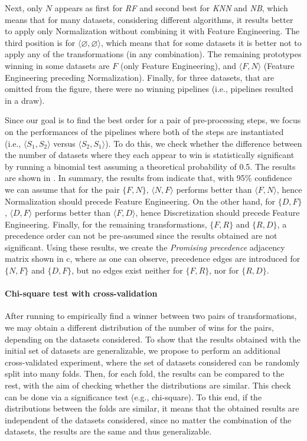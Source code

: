 \begin{example}
Next, only $N$ appears as first for \textit{RF} and second best for \textit{KNN} and \textit{NB}, which means that for many datasets, considering different algorithms, it results better to apply only Normalization without combining it with Feature Engineering.
The third position is for $\langle \varnothing,  \varnothing \rangle$, which means that for some datasets it is better not to apply any of the transformations (in any combination).
The remaining prototypes winning in some datasets are $F$ (only Feature Engineering), and $\langle F, N \rangle$ (Feature Engineering preceding Normalization).
Finally, for three datasets, that are omitted from the figure, there were no winning pipelines (i.e., pipelines resulted in a draw).

Since our goal is to find the best order for a pair of pre-processing steps, we focus on the performances of the pipelines where both of the steps are instantiated (i.e., $\langle S_1, S_2 \rangle$ versus $\langle S_2, S_1 \rangle$).
To do this, we check whether the difference between the number of datasets where they each appear to win is statistically significant by running a binomial test assuming a theoretical probability of 0.5.
The results are shown in .
In summary, the results from  indicate that, with 95\% confidence we can assume that for the pair $\{F,N\}$, $\langle N, F \rangle$ performs better than $\langle F, N \rangle$, hence Normalization should precede Feature Engineering.
On the other hand, for $\{D,F\}$, $\langle D, F \rangle$ performs better than $\langle F, D \rangle$, hence Discretization should precede Feature Engineering.
Finally, for the remaining transformations, $\{F,R\}$ and $\{R,D\}$, a precedence order can not be pre-assumed since the results obtained are not significant.
Using these results, we create the \textit{Promising precedence} adjacency matrix shown in c, where as one can observe, precedence edges are introduced for $\{N,F\}$ and $\{D,F\}$, but no edges exist neither for $\{F,R\}$, nor for $\{R,D\}$.
\end{example}

\paragraph{Chi-square test with cross-validation}
\label{sec:learned-rules-validation}
After running  to empirically find a winner between two pairs of transformations, we may obtain a different distribution of the number of wins for the pairs, depending on the datasets considered.
To show that the results obtained with the initial set of datasets are generalizable, we propose to perform an additional cross-validated experiment, where the set of datasets considered can be randomly split into many folds.
Then, for each fold, the results can be compared to the rest, with the aim of checking whether the distributions are similar.
This check can be done via a significance test (e.g., chi-square).
To this end, if the distributions between the folds are similar, it means that the obtained results are independent of the datasets considered, since no matter the combination of the datasets, the results are the same and thus generalizable.


